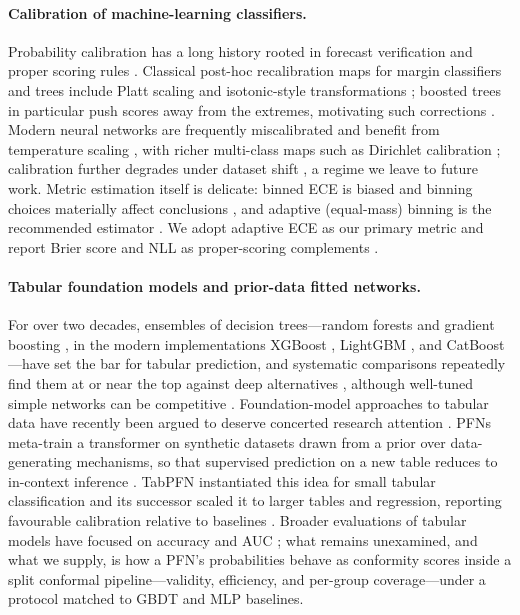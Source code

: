 \documentclass[review,12pt]{elsarticle}
\begin{document}
\paragraph{Calibration of machine-learning classifiers.}
Probability calibration has a long history rooted in forecast verification and proper scoring rules \cite{brier1950,gneiting2007}. Classical post-hoc recalibration maps for margin classifiers and trees include Platt scaling and isotonic-style transformations \cite{platt1999,zadrozny2002}; boosted trees in particular push scores away from the extremes, motivating such corrections \cite{niculescu2005}. Modern neural networks are frequently miscalibrated and benefit from temperature scaling \cite{guo2017}, with richer multi-class maps such as Dirichlet calibration \cite{kull2019}; calibration further degrades under dataset shift \cite{ovadia2019}, a regime we leave to future work. Metric estimation itself is delicate: binned ECE is biased and binning choices materially affect conclusions \cite{naeini2015,vaicenavicius2019}, and adaptive (equal-mass) binning is the recommended estimator \cite{nixon2019}. We adopt adaptive ECE as our primary metric and report Brier score and NLL as proper-scoring complements \cite{brier1950,gneiting2007}.

\paragraph{Tabular foundation models and prior-data fitted networks.}
For over two decades, ensembles of decision trees---random forests \cite{breiman2001} and gradient boosting \cite{friedman2001}, in the modern implementations XGBoost \cite{chen2016}, LightGBM \cite{ke2017}, and CatBoost \cite{prokhorenkova2018}---have set the bar for tabular prediction, and systematic comparisons repeatedly find them at or near the top against deep alternatives \cite{grinsztajn2022,shwartz2022,borisov2024}, although well-tuned simple networks can be competitive \cite{kadra2021,gorishniy2021}. Foundation-model approaches to tabular data have recently been argued to deserve concerted research attention \cite{vanbreugel2024}. PFNs meta-train a transformer on synthetic datasets drawn from a prior over data-generating mechanisms, so that supervised prediction on a new table reduces to in-context inference \cite{pfn2022}. TabPFN instantiated this idea for small tabular classification \cite{tabpfn2023} and its successor scaled it to larger tables and regression, reporting favourable calibration relative to baselines \cite{tabpfn2025}. Broader evaluations of tabular models have focused on accuracy and AUC \cite{grinsztajn2022,mcelfresh2023}; what remains unexamined, and what we supply, is how a PFN's probabilities behave as conformity scores inside a split conformal pipeline---validity, efficiency, and per-group coverage---under a protocol matched to GBDT and MLP baselines.
\end{document}
